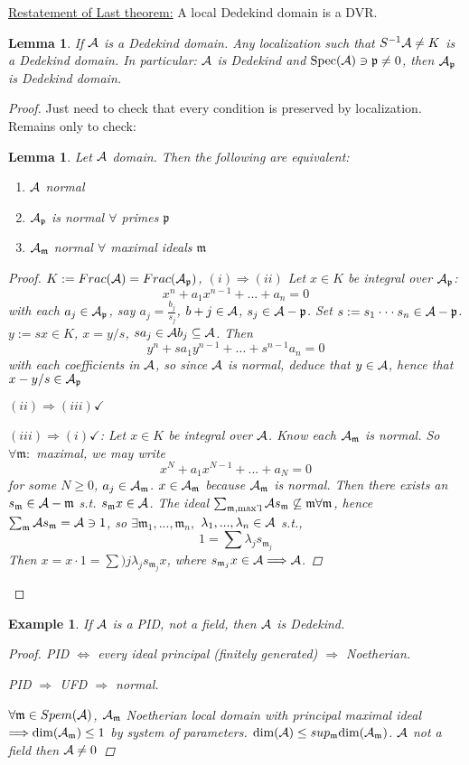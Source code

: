 \documentclass[11pt]{article}
\newtheorem{lemma}[thm]{Lemma}
\newtheorem{ex}[thm]{Example}
\newcommand{\scm}{{\mathfrak m}}
\newcommand{\scp}{{\mathfrak p}}
\newcommand{\cala}{{\cal A}}
\newcommand{\Lrta}{\Longrightarrow}
\newcommand{\Llrta}{\Longleftrightarrow}
\begin{document}
\underline{Restatement of Last theorem:} A local Dedekind domain is a DVR. 
\begin{lemma}If $\cala$ is a Dedekind domain.
Any localization such that $S^{-1}\cala\neq K$ is a Dedekind domain. In particular: $\cala$ is Dedekind and $\text{Spec}(\cala)\ni\scp\neq 0$, then $\cala_\scp$ is Dedekind domain.
\end{lemma} 
\begin{proof}
Just need to check that every condition is preserved by localization. Remains only to check:
\begin{lemma}
Let $\cala$ domain. Then the following are equivalent:
\begin{enumerate}[label=(\roman*)]
\item $\cala$ normal
\item $\cala_\scp$ is normal $\forall$ primes $\scp$
\item $\cala_\scm$ normal $\forall$ maximal ideals $\scm$
\end{enumerate}
\begin{proof}
$K:= Frac(\cala)=Frac(\cala_\scp)$,
$(i)\Lrta (ii)$ Let $x\in K$ be integral over $\cala_\scp$: 
$$
x^n+a_1 x^{n-1}+...+a_n=0
$$
with each $a_j\in\cala_\scp$, say $a_j=\frac{b_j}{s_j}$, $b+j\in \cala$, $s_j\in\cala-\scp$.
Set $s:=s_1\cdot\cdot\cdot s_n\in\cala-\scp$. $y:=sx\in K$, $x=y/s$, $sa_j\in\cala b_j\subseteq \cala$.
Then 
$$
y^n+s a_1 y^{n-1}+...+s^{n-1}a_n
=0
$$
with each coefficients in $\cala$, so since $\cala$ is normal, deduce that $y\in\cala$, hence that $x-y/s\in\cala_\scp$

$(ii)\Lrta (iii)\checkmark$

$(iii)\Lrta (i)\checkmark$: Let $x\in K$ be integral over $\cala$. Know each $\cala_\scm$ is normal. So $\forall \scm:$ maximal, we may write 
$$
x^{N}+a_1x^{N-1}+...+a_{N}=0
$$
for some $N\geq 0$, $a_{j}\in\cala_\scm$. $x\in\cala_\scm$ because $\cala_\scm$ is normal. Then there exists an $s_\scm\in\cala-\scm$ s.t. $s_\scm x\in\cala$. The ideal $\sum_{\scm,\text{max'l}}\cala s_\scm\not\subseteq \scm\forall\scm$, hence $\sum_{\scm}\cala s_\scm=\cala\ni 1$, so $\exists \scm_1,...,\scm_n,$ $\lambda_1,...,\lambda_n\in \cala$ s.t.,
$$
1=\sum\lambda_js_{\scm_j}
$$
Then $x=x\cdot 1=\sum)j\lambda_j s_{\scm_j}x$, where $s_{\scm_j}x\in\cala\Lrta \cala$.
\end{proof}
\end{lemma}
\end{proof}

\begin{ex}
If $\cala$ is a PID, not a field, then $\cala$ is Dedekind.
\begin{proof}
PID $\Llrta$ every ideal principal (finitely generated) $\Lrta $ Noetherian.

PID $\Lrta $ UFD $\Lrta$ normal.

$\forall\scm\in Spem(\cala)$, $\cala_\scm$ Noetherian local domain with principal maximal ideal $\Lrta \text{dim}(\cala_\scm)\leq 1$ by system of parameters.
$\text{dim}(\cala)\leq sup_\scm \text{dim}(\cala_\scm)$. $\cala$ not a field then $\cala\neq 0$ 
\end{proof}
\end{ex}
\end{document}
